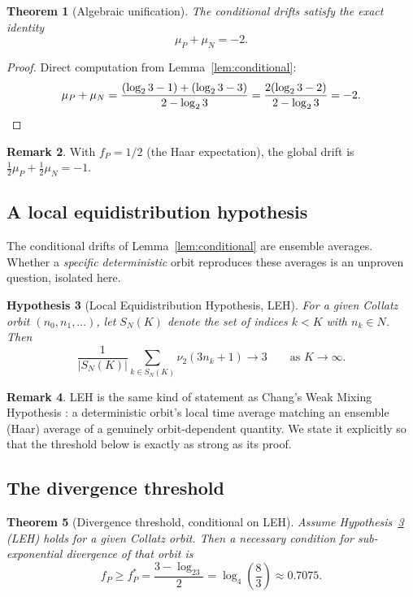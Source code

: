 \documentclass[12pt,reqno]{amsart}
\theoremstyle{plain}
\newtheorem{theorem}{Theorem}[section]
\newtheorem{hypothesis}[theorem]{Hypothesis}
\theoremstyle{definition}
\newtheorem{remark}[theorem]{Remark}
\newcommand{\nuTwo}{\nu_2}
\newcommand{\logtwo}{\log_2}
\newcommand{\logfour}{\log_4}
\newcommand{\fP}{f_P}
\newcommand{\fPstar}{f_P^*}
\newcommand{\muP}{\mu_P}
\newcommand{\muN}{\mu_N}
\begin{document}
\begin{theorem}[Algebraic unification]\label{thm:identity}
The conditional drifts satisfy the exact identity
\begin{equation}\label{eq:identity}
\muP + \muN = -2.
\end{equation}
\end{theorem}

\begin{proof}
Direct computation from Lemma~\ref{lem:conditional}:
\[
\muP + \muN
= \frac{(\logtwo 3 - 1) + (\logtwo 3 - 3)}{2 - \logtwo 3}
= \frac{2(\logtwo 3 - 2)}{2 - \logtwo 3}
= -2. \qedhere
\]
\end{proof}

\begin{remark}
With $\fP = 1/2$ (the Haar expectation), the global drift is
$\tfrac12 \muP + \tfrac12 \muN = -1$.
\end{remark}

\subsection{A local equidistribution hypothesis}

The conditional drifts of Lemma~\ref{lem:conditional} are ensemble averages.
Whether a \emph{specific deterministic} orbit reproduces these averages is an
unproven question, isolated here.

\begin{hypothesis}[Local Equidistribution Hypothesis, LEH]\label{hyp:leh}
For a given Collatz orbit $(n_0, n_1, \ldots)$, let $S_N(K)$ denote the set of
indices $k < K$ with $n_k \in N$. Then
\[
\frac{1}{|S_N(K)|} \sum_{k \in S_N(K)} \nuTwo(3n_k+1) \longrightarrow 3
\qquad \text{as } K \to \infty.
\]
\end{hypothesis}

\begin{remark}
LEH is the same kind of statement as Chang's Weak Mixing Hypothesis
\cite{chang2026paradigm}: a deterministic orbit's local time average matching
an ensemble (Haar) average of a genuinely orbit-dependent quantity. We state
it explicitly so that the threshold below is exactly as strong as its proof.
\end{remark}

\subsection{The divergence threshold}

\begin{theorem}[Divergence threshold, conditional on LEH]\label{thm:threshold}
Assume Hypothesis~\ref{hyp:leh} (LEH) holds for a given Collatz orbit. Then a
necessary condition for sub-exponential divergence of that orbit is
\begin{equation}\label{eq:threshold-thm}
\fP \geq \fPstar = \frac{3 - \logtwo 3}{2} = \logfour\!\left(\frac{8}{3}\right) \approx 0.7075.
\end{equation}
\end{theorem}
\end{document}
